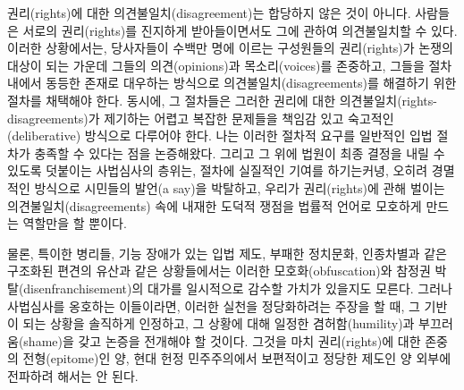 \documentclass[a4paper,12pt,oneside]{article}  %
\begin{document}
권리(rights)에 대한 의견불일치(disagreement)는 합당하지 않은 것이
아니다. 사람들은 서로의 권리(rights)를 진지하게 받아들이면서도 그에
관하여 의견불일치할 수 있다. 이러한 상황에서는, 당사자들이 수백만 명에
이르는 구성원들의 권리(rights)가 논쟁의 대상이 되는 가운데 그들의
의견(opinions)과 목소리(voices)를 존중하고, 그들을 절차 내에서 동등한
존재로 대우하는 방식으로 의견불일치(disagreements)를 해결하기 위한
절차를 채택해야 한다. 동시에, 그 절차들은 그러한 권리에 대한
의견불일치(rights-disagreements)가 제기하는 어렵고 복잡한 문제들을
책임감 있고 숙고적인(deliberative) 방식으로 다루어야 한다. 나는 이러한
절차적 요구를 일반적인 입법 절차가 충족할 수 있다는 점을 논증해왔다.
그리고 그 위에 법원이 최종 결정을 내릴 수 있도록 덧붙이는 사법심사의
층위는, 절차에 실질적인 기여를 하기는커녕, 오히려 경멸적인 방식으로
시민들의 발언(a say)을 박탈하고, 우리가 권리(rights)에 관해 벌이는
의견불일치(disagreements) 속에 내재한 도덕적 쟁점을 법률적 언어로
모호하게 만드는 역할만을 할 뿐이다.

물론, 특이한 병리들, 기능 장애가 있는 입법 제도, 부패한 정치문화,
인종차별과 같은 구조화된 편견의 유산과 같은 상황들에서는 이러한
모호화(obfuscation)와 참정권 박탈(disenfranchisement)의 대가를 일시적으로
감수할 가치가 있을지도 모른다. 그러나 사법심사를 옹호하는 이들이라면,
이러한 실천을 정당화하려는 주장을 할 때, 그 기반이 되는 상황을 솔직하게
인정하고, 그 상황에 대해 일정한 겸허함(humility)과 부끄러움(shame)을
갖고 논증을 전개해야 할 것이다. 그것을 마치 권리(rights)에 대한 존중의
전형(epitome)인 양, 현대 헌정 민주주의에서 보편적이고 정당한 제도인 양
외부에 전파하려 해서는 안 된다.

\clearpage
\backmatter
\end{document}
